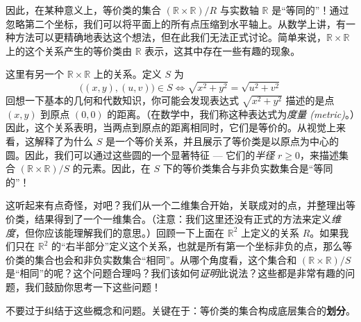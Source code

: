 因此，在某种意义上，等价类的集合 $(\mathbb{R} \times \mathbb{R})/R$ 与实数轴 $\mathbb{R}$ 是``等同的''！通过忽略第二个坐标，我们可以将平面上的所有点压缩到水平轴上。从数学上讲，有一种方法可以更精确地表达这个想法，但在此我们无法正式讨论。简单来说，$\mathbb{R} \times \mathbb{R}$ 上的这个关系产生的等价类由 $\mathbb{R}$ 表示，这其中存在一些有趣的现象。

这里有另一个 $\mathbb{R} \times \mathbb{R}$ 上的关系。定义 $S$ 为
\[\big((x, y),(u, v)\big) \in S \iff \sqrt{x^2+y^2} = \sqrt{u^2+v^2}\]
回想一下基本的几何和代数知识，你可能会发现表达式 $\sqrt{x^2 + y^2}$ 描述的是点 $(x, y)$ 到原点 $(0, 0)$ 的距离。（在数学中，我们称这种表达式为\emph{度量 (metric)}。）因此，这个关系表明，当两点到原点的距离相同时，它们是等价的。从视觉上来看，这解释了为什么 $S$ 是一个等价关系，并且展示了等价类是以原点为中心的圆。因此，我们可以通过这些圆的一个显著特征 --- 它们的\emph{半径} $r \ge 0$，来描述集合 $(\mathbb{R} \times \mathbb{R})/S$ 的元素。因此，在 $S$ 下的等价类集合与非负实数集合是``等同的''！

\begin{center}
    {}
\end{center}

这听起来有点奇怪，对吧？我们从一个二维集合开始，关联成对的点，并整理出等价类，结果得到了一个一维集合。（注意：我们这里还没有正式的方法来定义\emph{维度}，但你应该能理解我们的意思。）回顾一下上面在 $\mathbb{R}^2$ 上定义的关系 $R$。如果我们只在 $\mathbb{R}^2$ 的``右半部分''定义这个关系，也就是所有第一个坐标非负的点，那么等价类的集合也会和非负实数集合``相同''。从哪个角度看，这个集合和 $(\mathbb{R} \times \mathbb{R})/S$ 是``相同''的呢？这个问题合理吗？我们该如何\emph{证明}此说法？这些都是非常有趣的问题，我们鼓励你思考一下这些问题！

不要过于纠结于这些概念和问题。关键在于：等价类的集合构成底层集合的\textbf{划分}。

